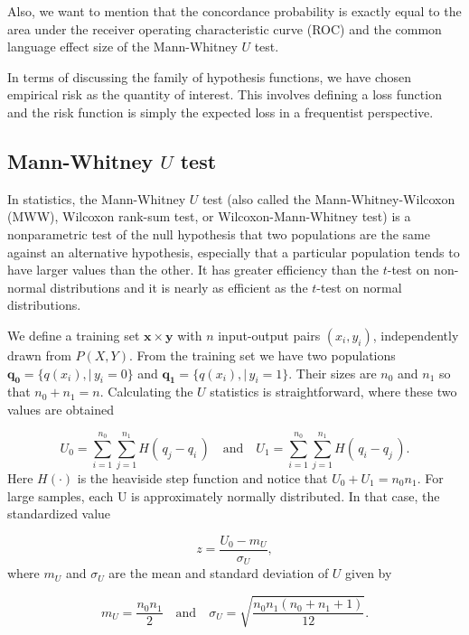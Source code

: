 \documentclass{article}
\theoremstyle{theorem}
\theoremstyle{definition}
\newcommand{\bu}[1]{\mathbf{#1}}
\newcommand{\bv}[1]{\bm{#1}}
\begin{document}
Also, we want to mention that the concordance probability is exactly equal to the area under the receiver operating characteristic curve (ROC) and the common language effect size of the Mann-Whitney $U$ test.

In terms of discussing the family of hypothesis functions, we have chosen empirical risk as the quantity of interest.  This involves defining a loss function and the risk function is simply the expected loss in a frequentist perspective.

\subsection{Mann-Whitney $U$ test}
\label{sec:U}

In statistics, the Mann-Whitney $U$ test (also called the Mann-Whitney-Wilcoxon (MWW), Wilcoxon rank-sum test, or Wilcoxon-Mann-Whitney test) is a nonparametric test of the null hypothesis that two populations are the same against an alternative hypothesis, especially that a particular population tends to have larger values than the other.  It has greater efficiency than the $t$-test on non-normal distributions and it is nearly as efficient as the $t$-test on normal distributions.

We define a training set $\bu{x} \times \bv{y}$ with $n$ input-output pairs $(x_i, y_i)$, independently drawn from $P(X,Y)$.  From the training set we have two populations $\bv{q_0} = \{q(x_i) , | \, y_i = 0 \}$ and $\bv{q_1} = \{q(x_i) , | \, y_i = 1 \}$.  Their sizes are $n_0$ and $n_1$ so that $n_0 + n_1 = n$.  Calculating the $U$ statistics is straightforward, where these two values are obtained 

\begin{equation}
\label{eq:U}
U_0 = \sum_{i=1}^{n_0}\sum_{j=1}^{n_1} H(\,q_j - q_i    \,) \quad \mbox{and} \quad 
U_1 = \sum_{i=1}^{n_0}\sum_{j=1}^{n_1} H( \,q_i - q_j    \,).
\end{equation}
Here $H(\cdot)$ is the heaviside step function and notice that $U_0 + U_1 = n_0n_1$.  For large samples, each U is approximately normally distributed. In that case, the standardized value

\begin{equation}
\label{eq:z}
z = \frac{U_0 - m_{U}}{\sigma_{U}},
\end{equation}
where $m_U$ and $\sigma_U$ are the mean and standard deviation of $U$ given by

\begin{equation}
\label{eq:z}
m_U = \frac{n_0n_1}{2} \quad \mbox{and} \quad 
\sigma_U = \sqrt{\frac{n_0n_1(n_0 + n_1 + 1)}{12} }.
\end{equation}
\end{document}

